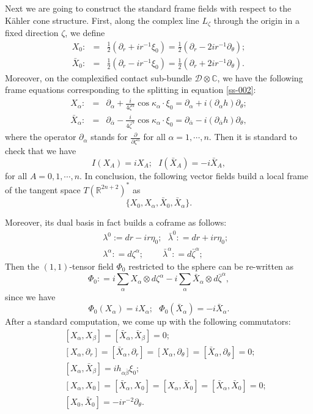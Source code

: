 \documentclass[a4paper,11pt]{amsart}
\numberwithin{equation}{section}
\def\d{\partial}
\def\cD{{\mathcal D}}
\def\bC{{\mathbb C}}
\def\bR{{\mathbb R}}
\def\a{{\alpha}}
\def\z{{\zeta}}
\def\b{\beta}
\def\k{{\kappa}}
\begin{document}
Next we are going to construct the standard frame fields with respect to the K\"ahler cone structure. 
First, along the complex line $L_{\z}$ through the origin in a fixed direction $\z$, we define 
\begin{eqnarray}
\label{bf-008}
X_0:&=& \frac{1}{2} \left( \d_r + i r^{-1} \xi_0 \right) =  \frac{1}{2} \left( \d_r - 2i r^{-1} \d_{\theta} \right);
\\
\bar X_{0}:&=& \frac{1}{2} \left( \d_r - i r^{-1} \xi_0 \right)=  \frac{1}{2} \left( \d_r + 2i r^{-1} \d_{\theta} \right). 
\end{eqnarray}
Moreover, on the complexified contact sub-bundle $\cD\otimes \bC$, we have the following frame equations 
corresponding to the splitting in equation \eqref{ss-002}:
\begin{eqnarray}
\label{bf-009}
X_{\a}:&=& \d_{\a} + \frac{i}{4\z^{\a}} \cos\k_{\a} \cdot \xi_0 = \d_{\a} + i ( \d_{\a} h) \d_{\theta};
\\
\bar X_{\a}:&=& \d_{\bar\a} - \frac{i}{4\bar\z^{\a}} \cos\k_{\a} \cdot \xi_0= \d_{\bar\a} - i ( \d_{\bar\a} h) \d_{\theta},
\end{eqnarray}
where the operator $\d_{\a}$ stands for $\frac{\d}{\d \z^{\a}}$ for all $\a = 1, \cdots, n$. 
Then it is standard to check that we have 
$$ I(X_A) = i X_A; \ \ \ I(\bar X_A) = -i \bar{X}_A, $$
for all $A= 0, 1, \cdots, n$. 
In conclusion, 
the following vector fields build a local frame of the tangent space $T(\bR^{2n+2})^*$ as 
$$ \{ X_0, X_{\a}, \bar X_{0}, \bar X_\a \}.$$ 

Moreover, its dual basis in fact builds a coframe as follows:   
\begin{eqnarray}
\label{bf-011}
&& \lambda^0:= dr - ir\eta_0; \ \ \ \bar\lambda^0 : = dr + ir \eta_0; 
\\
&& \lambda^{\a}: = d\z^{\a}; \ \ \ \ \ \ \ \ \ \ \bar\lambda^{\a}: = d\bar\z^{\a};
\end{eqnarray}
Then the $(1,1)$-tensor field $\Phi_0$ restricted to the sphere can be re-written as 
$$ \Phi_0: = i\sum_{\a} X_{\a}\otimes d\z^{\a} - i \sum_{\a} \bar X_{\a} \otimes d\bar\z^{\a}, $$
since we have 
\begin{equation}
\label{bf-012}
\Phi_0(X_\a) = i X_\a; \ \ \ \Phi_0(\bar X_\a) =- i \bar X_\a.
\end{equation}
After a standard computation, we come up with the following commutators: 
\begin{eqnarray}
\label{bf-0130}
&& [X_\a, X_\b] = [\bar X_\a, \bar X_{\b}]=0;
\\
\label{bf-0131}
&& [X_\a,  \d_{r}] = [\bar X_\a, \d_{r}]= [X_\a,  \d_{\theta}] = [\bar X_\a, \d_{\theta}]=0;
\\
\label{bf-0132}
&& [X_\a, \bar X_\b] = i h_{\a\bar\b} \xi_0;
\\
\label{bf-0133}
&& [X_\a, X_0] = [\bar X_\a, X_{0}]=[X_\a, \bar X_0] = [\bar X_\a, \bar X_{0}]= 0;
\\
\label{bf-0134}
&& [X_0, \bar X_0] = -i r^{-2} \d_{\theta}.
\end{eqnarray}
\end{document}

